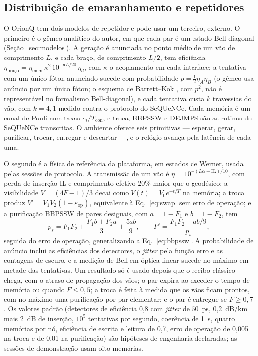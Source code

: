 \documentclass[12pt]{article}
\begin{document}
\subsection{Distribuição de emaranhamento e repetidores}
\label{sec:tec_emar}

O OrionQ tem dois modelos de repetidor e pode usar um terceiro, externo. O
primeiro é o gêmeo analítico do autor, em que cada par é um estado
Bell-diagonal (Seção~\ref{sec:modelos}). A geração é anunciada no ponto médio
de um vão de comprimento $L$, e cada braço, de comprimento $L/2$, tem eficiência
$\eta_{\text{braço}}=\eta_{\mathrm{mem}}\,\kappa^2\,10^{-\alpha L/20}\,\eta_d$,
com $\kappa$ o acoplamento em cada interface; a tentativa com um único fóton anunciado sucede com
probabilidade $p=\tfrac12\eta_A\eta_B$ (o gêmeo usa anúncio por um único fóton;
o esquema de Barrett--Kok \cite{barrett2005}, com $p^2$, não é representável no
formalismo Bell-diagonal), e cada tentativa custa $k$ travessias do vão, com $k=4{,}1$
medido contra o protocolo do SeQUeNCe. Cada memória é um canal de Pauli com taxas
$e_i/T_{\mathrm{coh}}$, e troca, BBPSSW e DEJMPS são as rotinas do SeQUeNCe
transcritas. O ambiente oferece seis primitivas --- esperar, gerar, purificar,
trocar, entregar e descartar ---, e o relógio avança pela latência de cada uma.

O segundo é a física de referência da plataforma, em estados de Werner, usada
pelas sessões de protocolo. A transmissão de um vão é
$\eta=10^{-(L\alpha+\mathrm{IL})/10}$, com perda de inserção IL e comprimento
efetivo 20\% maior que o geodésico; a visibilidade
$V=(4F-1)/3$ decai como $V(t)=V_0e^{-t/T}$ na memória; a troca produz
$V'=V_1V_2(1-\varepsilon_{\mathrm{op}})$, equivalente à Eq.~\ref{eq:swap} sem erro
de operação; e a purificação BBPSSW de pares desiguais, com $a=1-F_1$ e
$b=1-F_2$, tem
\begin{equation}
p_s=F_1F_2+\frac{F_1b+F_2a}{3}+\frac{5ab}{9},\qquad
F'=\frac{F_1F_2+ab/9}{p_s},
\label{eq:bbpssw_ref}
\end{equation}
seguida do erro de operação, generalizando a Eq.~\ref{eq:bbpssw}. A probabilidade
de anúncio inclui as eficiências dos detectores, o \textit{jitter} pela função
erro e as contagens de escuro, e a medição de Bell em óptica linear sucede no
máximo em metade das tentativas. Um resultado só é usado depois que o recibo
clássico chega, com o atraso de propagação dos vãos; o par expira ao exceder o
tempo de memória ou quando $F\le0{,}5$; a troca é feita à medida que os vãos
ficam prontos, com no máximo uma purificação por par elementar; e o par é
entregue se $F\ge0{,}7$. Os valores padrão (detectores de eficiência 0,8 com
\textit{jitter} de 50~ps, 0,2~dB/km mais 2~dB de inserção, $10^5$ tentativas por
segundo, coerência de 1~s, quatro memórias por nó, eficiência de escrita e
leitura de 0,7, erro de operação de 0,005 na troca e de 0,01 na purificação) são
hipóteses de engenharia declaradas; as sessões de demonstração usam oito
memórias.
\end{document}
